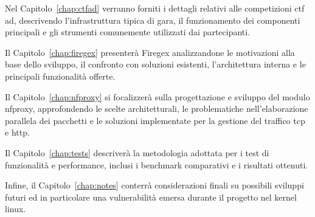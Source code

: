 Nel Capitolo~\ref{chap:ctfad} verranno forniti i dettagli relativi alle competizioni \gls{ctf} \gls{ad}, descrivendo l'infrastruttura tipica di gara, il funzionamento dei componenti principali e gli strumenti comunemente utilizzati dai partecipanti.

Il Capitolo~\ref{chap:firegex} presenterà Firegex analizzandone le motivazioni alla base dello sviluppo, il confronto con soluzioni esistenti, l'architettura interna e le principali funzionalità offerte.

Il Capitolo~\ref{chap:nfproxy} si focalizzerà sulla progettazione e sviluppo del modulo nfproxy, approfondendo le scelte architetturali, le problematiche nell'elaborazione parallela dei pacchetti e le soluzioni implementate per la gestione del traffico \gls{tcp} e \gls{http}.

Il Capitolo~\ref{chap:tests} descriverà la metodologia adottata per i test di funzionalità e performance, inclusi i benchmark comparativi e i risultati ottenuti.

Infine, il Capitolo~\ref{chap:notes} conterrà considerazioni finali su possibili sviluppi futuri ed in particolare una vulnerabilità emersa durante il progetto nel kernel linux.

